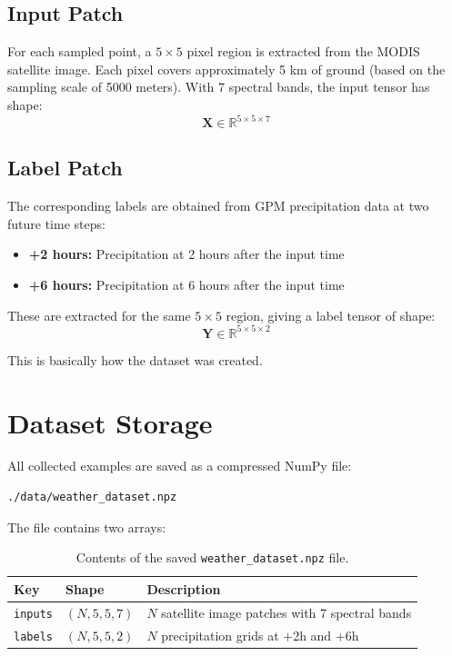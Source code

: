 \documentclass[12pt, a4paper]{report}
\begin{document}
\subsection{Input Patch}
For each sampled point, a $5 \times 5$ pixel region is extracted from the MODIS satellite image. Each pixel covers approximately 5 km of ground (based on the sampling scale of 5000 meters). With 7 spectral bands, the input tensor has shape:
\begin{equation}
    \mathbf{X} \in \mathbb{R}^{5 \times 5 \times 7}
    \label{eq:input_shape}
\end{equation}

\subsection{Label Patch}
The corresponding labels are obtained from GPM precipitation data at two future time steps:
\begin{itemize}
    \item \textbf{+2 hours:} Precipitation at 2 hours after the input time
    \item \textbf{+6 hours:} Precipitation at 6 hours after the input time
\end{itemize}

These are extracted for the same $5 \times 5$ region, giving a label tensor of shape:
\begin{equation}
    \mathbf{Y} \in \mathbb{R}^{5 \times 5 \times 2}
    \label{eq:label_shape}
\end{equation}

This is basically how the dataset was created.

\section{Dataset Storage}

All collected examples are saved as a compressed NumPy file:
\begin{verbatim}
./data/weather_dataset.npz
\end{verbatim}

The file contains two arrays:
\begin{table}[H]
\centering
\begin{tabular}{@{}lll@{}}
\toprule
\textbf{Key} & \textbf{Shape} & \textbf{Description} \\
\midrule
\texttt{inputs} & $(N, 5, 5, 7)$ & $N$ satellite image patches with 7 spectral bands \\
\texttt{labels} & $(N, 5, 5, 2)$ & $N$ precipitation grids at +2h and +6h \\
\bottomrule
\end{tabular}
\caption{Contents of the saved \texttt{weather\_dataset.npz} file.}
\label{tab:npz_contents}
\end{table}
\end{document}
